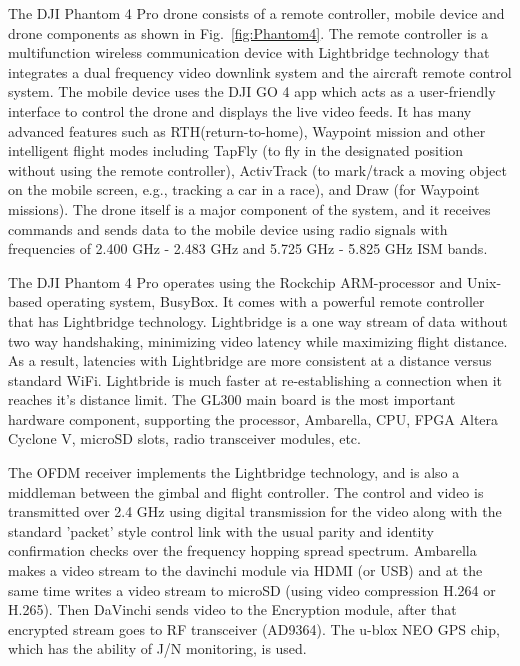 \documentclass[conference]{IEEEtran}
\begin{document}
The DJI Phantom 4 Pro drone consists of a remote controller, mobile device and drone components as shown in Fig.~\ref{fig:Phantom4}. 
The remote controller is a multifunction wireless communication  device with Lightbridge technology that integrates a dual frequency video downlink system and the aircraft remote control system. 
The mobile device uses the DJI GO 4 app which acts as a user-friendly interface to control the drone and displays the live video feeds. 
It has many advanced features such as RTH(return-to-home), Waypoint mission and other intelligent flight modes including TapFly (to fly in the designated position without using the remote controller), ActivTrack
(to mark/track a moving object on the mobile screen, e.g., tracking a car in a race), and Draw (for Waypoint missions).
The drone itself is a major component of the system, and it receives commands and sends data to the mobile device using radio signals with frequencies of 2.400 GHz - 2.483 GHz and 5.725 GHz - 5.825 GHz ISM bands.


The DJI Phantom 4 Pro operates using the Rockchip ARM-processor and Unix-based operating system, BusyBox. 
It comes with a powerful remote controller that has Lightbridge technology. Lightbridge is a one way stream of data without two way handshaking, minimizing video latency while maximizing flight distance.
As a result, latencies with Lightbridge are more consistent at a distance versus standard WiFi. Lightbride is much faster at re-establishing a connection when it reaches it’s distance limit. The GL300 main board is the most important hardware component, supporting the processor, Ambarella, CPU, FPGA Altera Cyclone V, microSD slots, radio transceiver modules, etc. 

The OFDM receiver implements the Lightbridge technology, and is also a middleman between the gimbal and flight controller. The control and video is transmitted over 2.4 GHz using digital transmission for the video along with the standard 'packet' style control link with the usual parity and identity confirmation checks over the frequency hopping spread spectrum.
Ambarella makes a video stream to the davinchi module via HDMI (or USB) and at the same time writes a video stream to microSD (using video compression H.264 or H.265). Then DaVinchi sends video to the Encryption module, after that encrypted stream goes to RF transceiver (AD9364).
The u-blox NEO GPS chip, which has the ability of J/N monitoring, is used.
\end{document}
